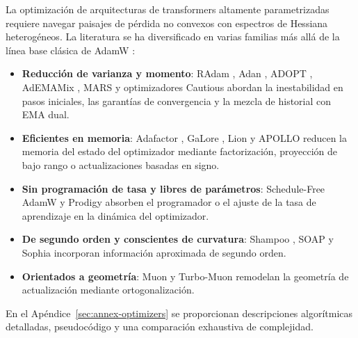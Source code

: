 La optimización de arquitecturas de transformers altamente parametrizadas requiere navegar paisajes de pérdida no convexos con espectros de Hessiana heterogéneos. La literatura se ha diversificado en varias familias más allá de la línea base clásica de AdamW \citep{loshchilov_decoupled_2017}:

\begin{itemize}[leftmargin=*]
    \item \textbf{Reducción de varianza y momento}: RAdam \citep{liu_variance_2019}, Adan \citep{xie_adan_2022}, ADOPT \citep{taniguchi_adopt_2024}, AdEMAMix \citep{pagliardini_ademamix_2024}, MARS \citep{yuan_mars_2024} y optimizadores Cautious \citep{liang_cautious_2024} abordan la inestabilidad en pasos iniciales, las garantías de convergencia y la mezcla de historial con EMA dual.
    \item \textbf{Eficientes en memoria}: Adafactor \citep{shazeer_adafactor_2018}, GaLore \citep{zhao_galore_2024}, Lion \citep{chen_symbolic_2023} y APOLLO \citep{zhu2025apollosgdlikememoryadamwlevel} reducen la memoria del estado del optimizador mediante factorización, proyección de bajo rango o actualizaciones basadas en signo.
    \item \textbf{Sin programación de tasa y libres de parámetros}: Schedule-Free AdamW \citep{defazio_road_2024} y Prodigy \citep{mishchenko_prodigy_2023} absorben el programador o el ajuste de la tasa de aprendizaje en la dinámica del optimizador.
    \item \textbf{De segundo orden y conscientes de curvatura}: Shampoo \citep{gupta_shampoo_2018}, SOAP \citep{vyas_soap_2024} y Sophia \citep{liu_sophia_2023} incorporan información aproximada de segundo orden.
    \item \textbf{Orientados a geometría}: Muon \citep{shen_convergence_2025} y Turbo-Muon \citep{boissin_turbo-muon_2025} remodelan la geometría de actualización mediante ortogonalización.
\end{itemize}

En el Apéndice~\ref{sec:annex-optimizers} se proporcionan descripciones algorítmicas detalladas, pseudocódigo y una comparación exhaustiva de complejidad.

